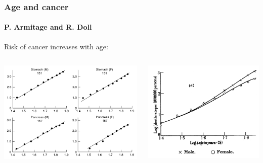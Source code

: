 \documentclass{beamer}
\begin{document}
\begin{frame}
    \frametitle{Age and cancer}
    \framesubtitle{P. Armitage and R. Doll\footnotemark[12]}

    \begin{center}
    Risk of cancer increases with age:
    \end{center}

    \begin{columns}
        \begin{column}{0.5\textwidth}
        \includegraphics[width=\textwidth]{figures/PArmitageRDoll_1954_6602297.pdf}
        \end{column}
        \begin{column}{0.5\textwidth}
        \includegraphics[width=\textwidth]{figures/ArmitageDoll1957_4A.png}
        \end{column}
    \end{columns}


\end{frame}
\end{document}
